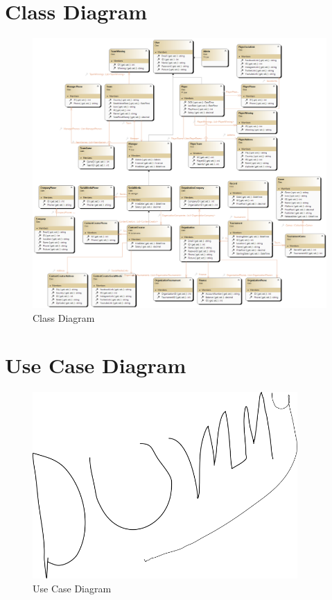 \section{Class Diagram}
\hrulefill
\begin{figure}[H]
    \centering
    \includegraphics[width=1\textwidth]{diagrams/ClassDiagram1.png}
    \caption{Class Diagram}
    \label{fig:Class Diagram}
\end{figure}

\clearpage
\section{Use Case Diagram}
\begin{figure}[h]
    \centering
    \includegraphics[width=0.9\textwidth]{images/dummy.png}
    \caption{Use Case Diagram}
    \label{fig:Use Case Diagram}
\end{figure}

